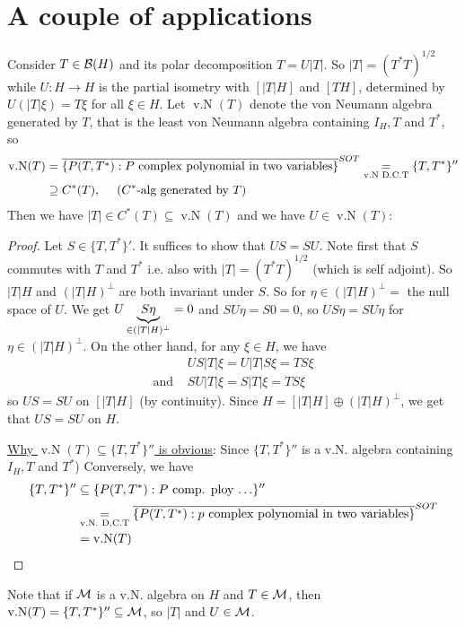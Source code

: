 \documentclass[10pt,english,a4paper]{article}
\theoremstyle{definition}
\let\emph\relax %
\DeclareMathOperator{\vN}{v.N}
\begin{document}
\section{A couple of applications}
Consider $T \in \mathcal{B}(H)$ and its polar decomposition $T = U|T|$. So 
$|T| = (T^*T)^{1/2}$ while $U\colon H\to H$ is the partial isometry 
with \emph{initial space} $[|T|H]$ and \emph{final space} $[TH]$, determined
by $U(|T|\xi) = T\xi$ for all $\xi \in H$.
Let $\vN(T)$ denote the von Neumann algebra generated by $T$, 
that is the least von Neumann algebra containing $I_H, T$ and $T^*$,
so 
\begin{align*}
 \vN(T) &= \ol{\{P(T,T^*): P \text{ complex polynomial in two variables}\}}^{SOT} 
\underset{\text{v.N D.C.T}}{=} \{T,T^*\}''  \\
&\supseteq C^*(T),\quad \text{ ($C^*$-alg generated by $T$)}
\end{align*}
Then we have $|T| \in C^*(T)\subseteq \vN(T)$ 
and we have $U \in \vN(T)$:
\begin{proof}
    Let $S \in \{T,T^*\}'$. It suffices to show that $US=SU$.
Note first that $S$ commutes with $T$ and $T^*$ i.e. also with 
$|T| = (T^*T)^{1/2}$ (which is self adjoint).
So $|T|H$ and $(|T|H)^{\perp}$ are both invariant 
under $S$. So for $\eta \in (|T|H)^{\perp}=$ the null space of $U$.
We get $U\underbrace{S\eta}_{\in(|T|H)^{\perp}} = 0$ and 
$SU\eta = S0 = 0$, so $US\eta = SU\eta$ for $\eta \in (|T|H)^{\perp}$.
On the other hand, for any $\xi \in H$, we have 
\begin{align*}
&US|T|\xi = U|T|S\xi = TS\xi \\
\text{and }&     
SU|T|\xi = S|T|\xi = TS\xi 
\end{align*}
so $US=SU$ on $[|T|H]$ (by continuity). 
Since $H = [|T|H] \oplus (|T|H)^{\perp}$, we get that 
$US=SU$ on $H$.

\ul{Why $\vN(T)\subseteq \{T,T^*\}''$ is obvious}: Since
$\{T,T^*\}''$ is a v.N. algebra containing $I_H, T$ and $T^*$)
Conversely, we have
\begin{align*}
\{T,T^*\}'' &\subseteq \{ P(T,T^*) : P\text{ comp. ploy $\ldots$}\}'' \\
&\underset{\text{v.N. D.C.T}}{=}  
\ol{\{P(T,T^*): p \text{ complex polynomial in two variables}\}}^{SOT} \\
&= \vN(T)
\end{align*}
\end{proof}

Note that if $\mathcal{M}$ is a v.N. algebra on $H$ and $T \in \mathcal{M}$, then 
$\vN(T) = \{T,T^*\}'' \subseteq \Ms$, so $|T|$ and $U \in \mathcal{M}$. 
\end{document}
